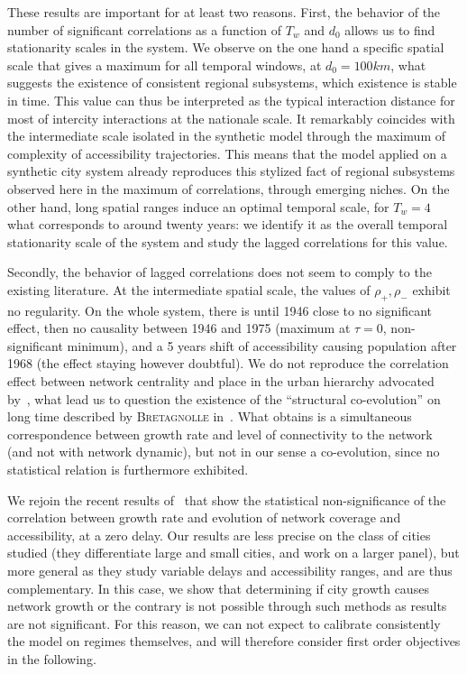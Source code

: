 \documentclass[11pt]{article}
\newcommand{\noun}[1]{\textsc{#1}}
\begin{document}
These results are important for at least two reasons. First, the behavior of the number of significant correlations as a function of $T_w$ and $d_0$ allows us to find stationarity scales in the system. We observe on the one hand a specific spatial scale that gives a maximum for all temporal windows, at $d_0 = 100km$, what suggests the existence of consistent regional subsystems, which existence is stable in time. This value can thus be interpreted as the typical interaction distance for most of intercity interactions at the nationale scale. It remarkably coincides with the intermediate scale isolated in the synthetic model through the maximum of complexity of accessibility trajectories. This means that the model applied on a synthetic city system already reproduces this stylized fact of regional subsystems observed here in the maximum of correlations, through emerging niches. On the other hand, long spatial ranges induce an optimal temporal scale, for $T_w = 4$ what corresponds to around twenty years: we identify it as the overall temporal stationarity scale of the system and study the lagged correlations for this value.



Secondly, the behavior of lagged correlations does not seem to comply to the existing literature. At the intermediate spatial scale, the values of $\rho_+,\rho_-$ exhibit no regularity. On the whole system, there is until 1946 close to no significant effect, then no causality between 1946 and 1975 (maximum at $\tau = 0$, non-significant minimum), and a 5 years shift of accessibility causing population after 1968 (the effect staying however doubtful). We do not reproduce the correlation effect between network centrality and place in the urban hierarchy advocated by~\cite{bretagnolle2003vitesse}, what lead us to question the existence of the ``structural co-evolution'' on long time described by \noun{Bretagnolle} in~\citep{espacegeo2014effets}. What \cite{bretagnolle2003vitesse} obtains is a simultaneous correspondence between growth rate and level of connectivity to the network (and not with network dynamic), but not in our sense a co-evolution, since no statistical relation is furthermore exhibited.


We rejoin the recent results of~\cite{mimeur:hal-01616746} that show the statistical non-significance of the correlation between growth rate and evolution of network coverage and accessibility, at a zero delay. Our results are less precise on the class of cities studied (they differentiate large and small cities, and work on a larger panel), but more general as they study variable delays and accessibility ranges, and are thus complementary. In this case, we show that determining if city growth causes network growth or the contrary is not possible through such methods as results are not significant. For this reason, we can not expect to calibrate consistently the model on regimes themselves, and will therefore consider first order objectives in the following.
\end{document}
